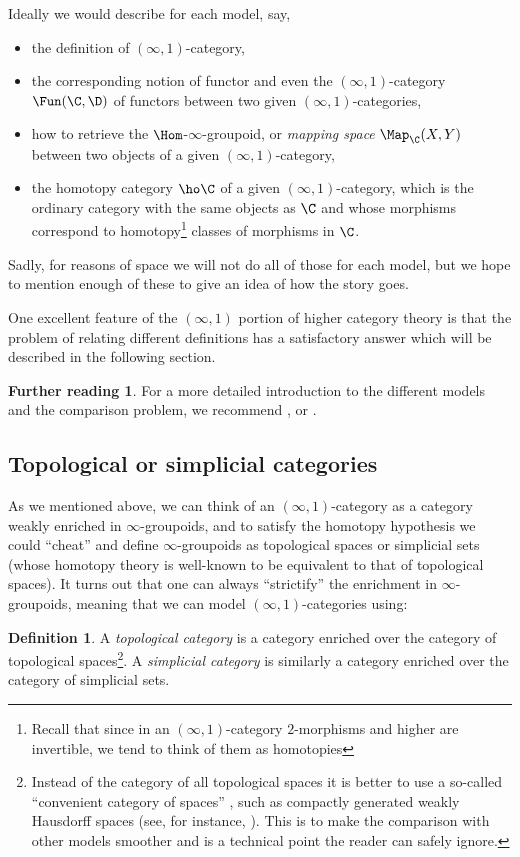 \documentclass[12pt]{amsart}
\theoremstyle{definition} \newtheorem{definition}[theorem]{Definition}
\newtheorem*{further}{Further reading}
\numberwithin{equation}{section}
\newcommand{\oo}{\infty}
\newcommand{\io}{$(\oo,1)$}
\begin{document}
Ideally we would describe for each model, say, \begin{itemize} \item
the definition of \io-category, \item the corresponding notion of
functor and even the \io-category $\Fun(\C,\D)$ of functors between
two given \io-categories, \item how to retrieve the
$\Hom$-$\oo$-groupoid, or \emph{mapping space} $\Map_\C(X,Y)$ between
two objects of a given \io-category, \item the homotopy category $\ho
\C$ of a given \io-category, which is the ordinary category with the
same objects as $\C$ and whose morphisms correspond to
homotopy\footnote{Recall that since in an \io-category $2$-morphisms
and higher are invertible, we tend to think of them as homotopies}
classes of morphisms in $\C$. \end{itemize}

Sadly, for reasons of space we will not do all of those for each
model, but we hope to mention enough of these to give an idea of how
the story goes.

One excellent feature of the \io{} portion of higher category theory
is that the problem of relating different definitions has a
satisfactory answer which will be described in the following section.

\begin{further} For a more detailed introduction to the different
models and the comparison problem, we recommend \cite{BergnerSurvey},
\cite{JoyalTierney} or \cite{Porter}. \end{further}

\subsection{Topological or simplicial categories}

As we mentioned above, we can think of an \io-category as a category
weakly enriched in $\oo$-groupoids, and to satisfy the homotopy
hypothesis we could ``cheat'' and define $\oo$-groupoids as
topological spaces or simplicial sets (whose homotopy theory is
well-known to be equivalent to that of topological spaces). It turns
out that one can always ``strictify'' the enrichment in
$\oo$-groupoids, meaning that we can model \io-categories using:

\begin{definition} A \emph{topological category} is a category
enriched over the category of topological spaces\footnote{Instead of
the category of all topological spaces it is better to use a so-called
``convenient category of spaces'' \cite{Steenrod}, such as compactly
generated weakly Hausdorff spaces (see, for instance,
\cite{Strickland}). This is to make the comparison with other models
smoother and is a technical point the reader can safely ignore.}. A
\emph{simplicial category} is similarly a category enriched over the
category of simplicial sets. \end{definition}
\end{document}
